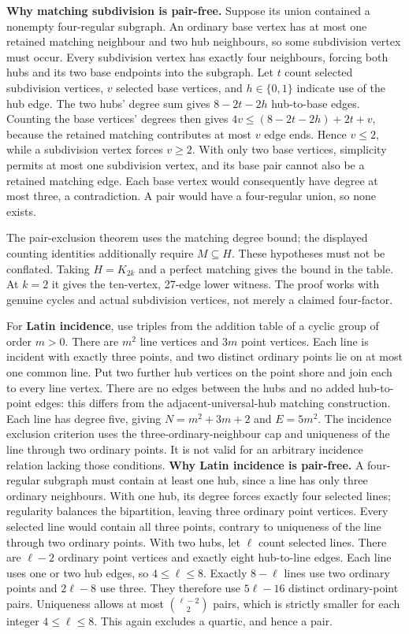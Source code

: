 \documentclass[
  11pt,
]{article}
\newcounter{none} %
\begin{document}
\textbf{Why matching subdivision is pair-free.} Suppose its union
contained a nonempty four-regular subgraph. An ordinary base vertex has
at most one retained matching neighbour and two hub neighbours, so some
subdivision vertex must occur. Every subdivision vertex has exactly four
neighbours, forcing both hubs and its two base endpoints into the
subgraph. Let \(t\) count selected subdivision vertices, \(v\) selected
base vertices, and \(h\in\{0,1\}\) indicate use of the hub edge. The two
hubs' degree sum gives \(8-2t-2h\) hub-to-base edges. Counting the base
vertices' degrees then gives \(4v\le(8-2t-2h)+2t+v\), because the
retained matching contributes at most \(v\) edge ends. Hence \(v\le2\),
while a subdivision vertex forces \(v\ge2\). With only two base
vertices, simplicity permits at most one subdivision vertex, and its
base pair cannot also be a retained matching edge. Each base vertex
would consequently have degree at most three, a contradiction. A pair
would have a four-regular union, so none exists.

The pair-exclusion theorem uses the matching degree bound; the displayed
counting identities additionally require \(M\subseteq H\). These
hypotheses must not be conflated. Taking \(H=K_{2k}\) and a perfect
matching gives the bound in the table. At \(k=2\) it gives the
ten-vertex, 27-edge lower witness. The proof works with genuine cycles
and actual subdivision vertices, not merely a claimed four-factor.

For \textbf{Latin incidence}, use triples from the addition table of a
cyclic group of order \(m>0\). There are \(m^2\) line vertices and
\(3m\) point vertices. Each line is incident with exactly three points,
and two distinct ordinary points lie on at most one common line. Put two
further hub vertices on the point shore and join each to every line
vertex. There are no edges between the hubs and no added hub-to-point
edges: this differs from the adjacent-universal-hub matching
construction. Each line has degree five, giving \(N=m^2+3m+2\) and
\(E=5m^2\). The incidence exclusion criterion uses the
three-ordinary-neighbour cap and uniqueness of the line through two
ordinary points. It is not valid for an arbitrary incidence relation
lacking those conditions. \textbf{Why Latin incidence is pair-free.} A
four-regular subgraph must contain at least one hub, since a line has
only three ordinary neighbours. With one hub, its degree forces exactly
four selected lines; regularity balances the bipartition, leaving three
ordinary point vertices. Every selected line would contain all three
points, contrary to uniqueness of the line through two ordinary points.
With two hubs, let \(\ell\) count selected lines. There are \(\ell-2\)
ordinary point vertices and exactly eight hub-to-line edges. Each line
uses one or two hub edges, so \(4\le\ell\le8\). Exactly \(8-\ell\) lines
use two ordinary points and \(2\ell-8\) use three. They therefore use
\(5\ell-16\) distinct ordinary-point pairs. Uniqueness allows at most
\(\binom{\ell-2}{2}\) pairs, which is strictly smaller for each integer
\(4\le\ell\le8\). This again excludes a quartic, and hence a pair.
\end{document}
